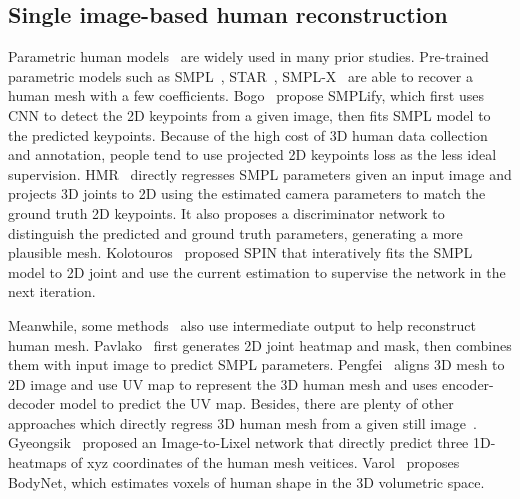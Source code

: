 \documentclass[10pt,twocolumn,letterpaper]{article}
\begin{document}
\subsection{Single image-based human reconstruction}
Parametric human models~\cite{anguelov2005scape,loper2015smpl,pavlakos2019expressive} are widely used in many prior studies. Pre-trained parametric models such as SMPL~\cite{loper2015smpl}, STAR~\cite{osman2020star}, SMPL-X~\cite{pavlakos2019expressive} are able to recover a human mesh with a few coefficients. Bogo\etal~\cite{bogo2016keep} propose SMPLify, which first uses CNN to detect the 2D keypoints from a given image, then fits SMPL model to the predicted keypoints. Because of the high cost of 3D human data collection and annotation, people tend to use projected 2D keypoints loss as the less ideal supervision. HMR~\cite{kanazawa2018end} directly regresses SMPL parameters given an input image and projects 3D joints to 2D using the estimated camera parameters to match the ground truth 2D keypoints. It also proposes a discriminator network to distinguish the predicted and ground truth parameters, generating a more plausible mesh. Kolotouros\etal~\cite{kolotouros2019learning} proposed SPIN that interatively fits the SMPL model to 2D joint and use the current estimation to supervise the network in the next iteration. \par 
Meanwhile, some methods~\cite{pavlakos2019expressive,yao2019densebody} also use intermediate output to help reconstruct human mesh. Pavlako\etal~\cite{pavlakos2019expressive} first generates 2D joint heatmap and mask, then combines them with input image to predict SMPL parameters. Pengfei\etal~\cite{yao2019densebody} aligns 3D mesh to 2D image and use UV map to represent the 3D human mesh and uses encoder-decoder model to predict the UV map. Besides, there are plenty of other approaches which directly regress 3D human mesh from a given still image~\cite{moon2020i2l,varol2018bodynet,kolotouros2019convolutional,choi2020pose2mesh,saito2019pifu}. Gyeongsik\etal~\cite{moon2020i2l} proposed an Image-to-Lixel network that directly predict three 1D-heatmaps of xyz coordinates of the human mesh veitices. Varol\etal~\cite{varol2018bodynet} proposes BodyNet, which estimates voxels of human shape in the 3D volumetric space.
\end{document}
